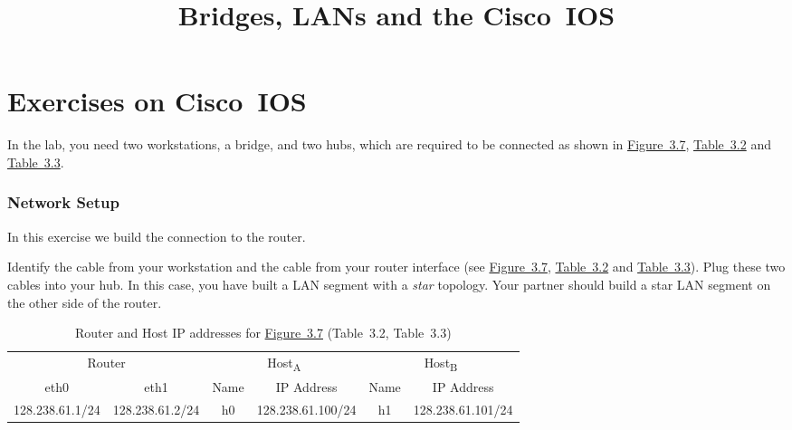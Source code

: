 \documentclass{../UTNetLab}
\title{Bridges, LANs and the Cisco~IOS}
\begin{document}
\part{Exercises on Cisco~IOS}
    In the lab, you need two workstations, a bridge, and two hubs, which are required to be connected as shown in \hyperref[fig:3.7]{Figure~3.7}, \hyperref[tab:3.2]{Table~3.2} and \hyperref[tab:3.3]{Table~3.3}.

\section{Network Setup}
    In this exercise we build the connection to the router.

    Identify the cable from your workstation and the cable from your router interface (see \hyperref[fig:3.7]{Figure~3.7}, \hyperref[tab:3.2]{Table~3.2} and \hyperref[tab:3.3]{Table~3.3}).
    Plug these two cables into your hub.
    In this case, you have built a LAN segment with a \textit{star} topology.
    Your partner should build a star LAN segment on the other side of the router.

    \begin{table}[H]
        \caption{Router and Host IP addresses for \hyperref[fig:3.7]{Figure~3.7} (Table~3.2\label{tab:3.2}, Table~3.3\label{tab:3.3})}
        \centering
        \begin{tabular}{ *2c|*2c|*2c }
            \hline \hline
            \multicolumn{2}{c|}{Router} & \multicolumn{2}{c|}{Host\textsubscript{A}} & \multicolumn{2}{c}{Host\textsubscript{B}} \\
            eth0 & eth1 & Name & IP Address & Name & IP Address \\
            \hline 
            128.238.61.1/24 & 128.238.61.2/24 & h0 & 128.238.61.100/24 & h1 & 128.238.61.101/24 \\
            \hline \hline
            \end{tabular}
    \end{table}
\end{document}
